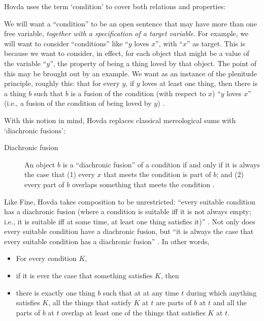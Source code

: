 \documentclass[11pt]{article}
\newenvironment{squote}{%
\begin{spacing}{1}
\begin{list}{}{%
\setlength{\labelwidth}{0pt}%
\rightmargin\leftmargin%
}
\item\relax
}{%
\end{list}%
\end{spacing}
}
\begin{document}
\begin{spacing}{1.5}
Hovda uses the term `condition' to cover both relations and
properties:

\begin{squote}
We will want a ``condition'' to be an open sentence that may have more
than one free variable, \emph{together with a specification of a
  target variable}. For example, we will want to consider
``conditions'' like ``$y$ loves $x$'', with ``$x$'' as target.  This
is because we want to consider, in effect, for each object that might
be a value of the variable ``$y$'', the property of being a thing
loved by that object.  The point of this may be brought out by an
example.  We want as an instance of the plenitude principle, roughly
this: that for every $y$, if $y$ loves at least one thing, then there
is a thing $b$ such that $b$ is a fusion of the condition (with
respect to $x$) ``$y$ loves $x$'' (i.e., a fusion of the condition of
being loved by $y$) \citeyearpar[sec. 1.1n2]{hovda2011}.
\end{squote}

With this notion in mind, Hovda replaces classical mereological sums
with `diachronic fusions':

\begin{description}
  \item[Diachronic fusion] An object $b$ is a ``diachronic fusion'' of
    a condition if and only if it is always the case that (1) every
    $x$ that meets the condition is part of $b$; and (2) every part of
    $b$ overlaps something that meets the condition
    \citeyearpar[sec. 1.1]{hovda2011}.
\end{description}

Like Fine, Hovda takes composition to be unrestricted: ``every
suitable condition has a diachronic fusion (where a condition is
suitable iff it is not always empty; i.e., it is suitable iff at some
time, at least one thing satisfies it)'' \citeyearpar[sec.
  3.1]{hovda2011}.  Not only does every suitable condition have a
diachronic fusion, but ``it is always the case that every suitable
condition has a diachronic fusion''
\citeyearpar[sec. 3.1.1]{hovda2011}.  In other words,

\begin{itemize}
  \item For every condition $K$,
  \item if it is ever the case that something satisfies $K$, then
  \item there is exactly one thing $b$ such that at at any time $t$
    during which anything satisfies $K$, all the things that satisfy
    $K$ at $t$ are parts of $b$ at $t$ and all the parts of $b$ at $t$
    overlap at least one of the things that satisfies $K$ at $t$.
\end{itemize}


\end{spacing}
\end{document}
